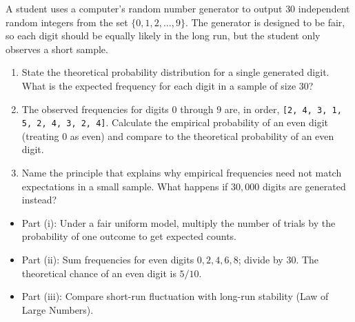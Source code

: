 
\begin{problem}
A student uses a computer's random number generator to output $30$ independent random integers from the set $\{0,1,2,\ldots,9\}$. The generator is designed to be fair, so each digit should be equally likely in the long run, but the student only observes a short sample.
\begin{enumerate}[label=\textbf{(\roman*)}]
  \item State the theoretical probability distribution for a single generated digit. What is the expected frequency for each digit in a sample of size $30$?
  \item The observed frequencies for digits $0$ through $9$ are, in order, \texttt{[2, 4, 3, 1, 5, 2, 4, 3, 2, 4]}. Calculate the empirical probability of an even digit (treating $0$ as even) and compare to the theoretical probability of an even digit.
  \item Name the principle that explains why empirical frequencies need not match expectations in a small sample. What happens if $30{,}000$ digits are generated instead?
\end{enumerate}
\end{problem}

\begin{hint}
\begin{itemize}[leftmargin=*]
  \item Part (i): Under a fair uniform model, multiply the number of trials by the probability of one outcome to get expected counts.
  \item Part (ii): Sum frequencies for even digits $0,2,4,6,8$; divide by $30$. The theoretical chance of an even digit is $5/10$.
  \item Part (iii): Compare short-run fluctuation with long-run stability (Law of Large Numbers).
\end{itemize}
\end{hint}

